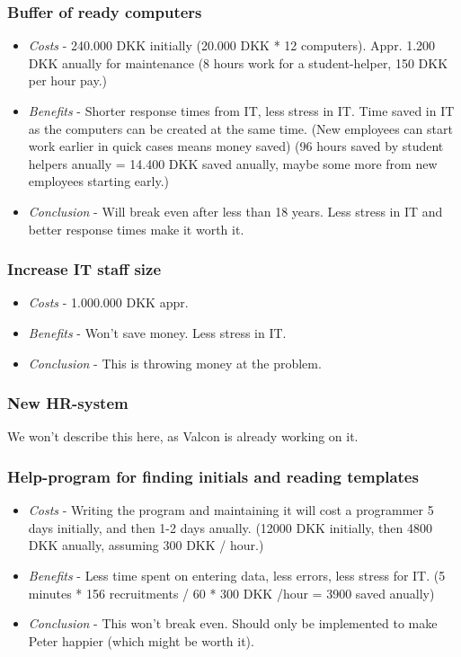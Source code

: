 \subsubsection{Buffer of ready computers}
\begin{itemize}
	\item \emph{Costs} - 240.000 DKK initially (20.000 DKK * 12 computers). Appr. 1.200 DKK anually for maintenance (8 hours work for a student-helper, 150 DKK per hour pay.)
	\item \emph{Benefits} - Shorter response times from IT, less stress in IT. Time saved in IT as the computers can be created at the same time. (New employees can start work earlier in quick cases means money saved) (96 hours saved by student helpers anually = 14.400 DKK saved anually, maybe some more from new employees starting early.)
	\item \emph{Conclusion} - Will break even after less than 18 years. Less stress in IT and better response times make it worth it. 
\end{itemize}

\subsubsection{Increase IT staff size}
\begin{itemize}
	\item \emph{Costs} - 1.000.000 DKK appr.
	\item \emph{Benefits} - Won't save money. Less stress in IT.
	\item \emph{Conclusion} - This is throwing money at the problem.
\end{itemize}

\subsubsection{New HR-system}
We won't describe this here, as Valcon is already working on it.

\subsubsection{Help-program for finding initials and reading templates}
\begin{itemize}
	\item \emph{Costs} - Writing the program and maintaining it will cost a programmer 5 days initially, and then 1-2 days anually. (12000 DKK initially, then 4800 DKK anually, assuming 300 DKK / hour.)
	\item \emph{Benefits} - Less time spent on entering data, less errors, less stress for IT. (5 minutes * 156 recruitments / 60 * 300 DKK /hour = 3900 saved anually)
	\item \emph{Conclusion} - This won't break even. Should only be implemented to make Peter happier (which might be worth it).
\end{itemize}

